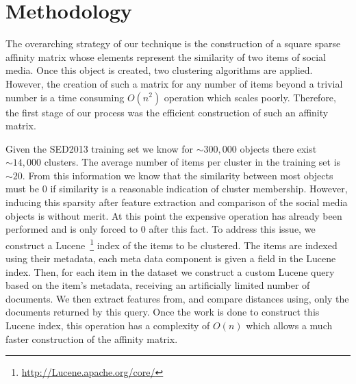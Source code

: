 \documentclass{../acm_proc_article-me11_tweaked}
\begin{document}

\section{Methodology} %
\label{sec:methodology}

The overarching strategy of our technique is the construction of a square sparse affinity matrix whose elements represent the similarity of two items of social media. Once this object is created, two clustering algorithms are applied. However, the creation of such a matrix for any number of items beyond a trivial number is a time consuming $O(n^2)$ operation which scales poorly. Therefore, the first stage of our process was the efficient construction of such an affinity matrix. 

Given the SED2013 training set we know for ${\sim}300,000$ objects there exist ${\sim}14,000$ clusters. The average number of items per cluster in the training set is ${\sim}20$. From this information we know that the similarity between most objects must be 0 if similarity is a reasonable indication of cluster membership. However, inducing this sparsity after feature extraction and comparison of the social media objects is without merit. At this point the expensive operation has already been performed and is only forced to 0 after this fact. To address this issue, we construct a Lucene~\footnote{\url{http://Lucene.apache.org/core/}} index of the items to be clustered. The items are indexed using their metadata, each meta data component is given a field in the Lucene index. Then, for each item in the dataset we construct a custom Lucene query based on the item's metadata, receiving an artificially limited number of documents. We then extract features from, and compare distances using, only the documents returned by this query. Once the work is done to construct this Lucene index, this operation has a complexity of $O(n)$ which allows a much faster construction of the affinity matrix.
\end{document}
